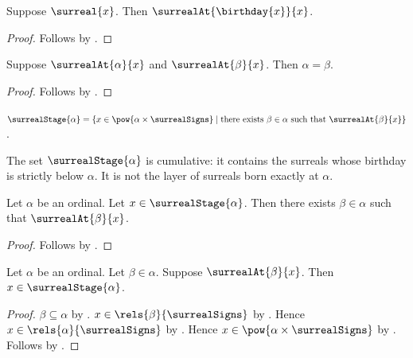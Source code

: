 \begin{proposition}\label{surreal_at_birthday}
    Suppose $\surreal{x}$.
    Then $\surrealAt{\birthday{x}}{x}$.
\end{proposition}
\begin{proof}
    Follows by .
\end{proof}

\begin{proposition}\label{surreal_birthday_unique}
    Suppose $\surrealAt{\alpha}{x}$ and $\surrealAt{\beta}{x}$.
    Then $\alpha=\beta$.
\end{proposition}
\begin{proof}
    Follows by .
\end{proof}

\begin{definition}\label{surreal_stage}
    $\surrealStage{\alpha}=
        \{x\in\pow{\alpha\times\surrealSigns}\mid
            \text{there exists $\beta\in\alpha$ such that
                $\surrealAt{\beta}{x}$}\}$.
\end{definition}

The set $\surrealStage{\alpha}$ is cumulative: it contains the surreals whose
birthday is strictly below $\alpha$.  It is not the layer of surreals born
exactly at $\alpha$.

\begin{proposition}\label{surreal_stage_elim}
    Let $\alpha$ be an ordinal.
    Let $x\in\surrealStage{\alpha}$.
    Then there exists $\beta\in\alpha$ such that
        $\surrealAt{\beta}{x}$.
\end{proposition}
\begin{proof}
    Follows by .
\end{proof}

\begin{proposition}\label{surreal_stage_intro}
    Let $\alpha$ be an ordinal.
    Let $\beta\in\alpha$.
    Suppose $\surrealAt{\beta}{x}$.
    Then $x\in\surrealStage{\alpha}$.
\end{proposition}
\begin{proof}
    $\beta\subseteq\alpha$ by .
    $x\in\rels{\beta}{\surrealSigns}$
        by .
    Hence $x\in\rels{\alpha}{\surrealSigns}$
        by .
    Hence $x\in\pow{\alpha\times\surrealSigns}$
        by .
    Follows by .
\end{proof}

